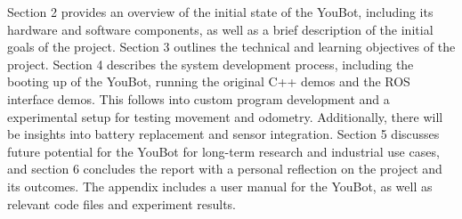\documentclass[a4paper, 12pt]{article}
\newif\ifshowadi
\newcommand{\adi}[1]{\ifshowadi\textcolor{red}{#1}\fi}
\newif\ifshownotes
\newcommand{\notes}[1]{\ifshownotes\textcolor{blue}{#1}\fi}
\begin{document}
    Section 2 provides an overview of the initial state of the YouBot, including its hardware and software components, as well as a brief description of the initial goals of the project. Section 3 outlines the technical and learning objectives of the project. Section 4 describes the system development process, including the booting up of the YouBot, running the original C++ demos and the ROS interface demos. This follows into custom program development and a experimental setup for testing movement and odometry. Additionally, there will be insights into battery replacement and sensor integration. Section 5 discusses future potential for the YouBot for long-term research and industrial use cases, and section 6 concludes the report with a personal reflection on the project and its outcomes. The appendix includes a user manual for the YouBot, as well as relevant code files and experiment results. 







    
\end{document}
